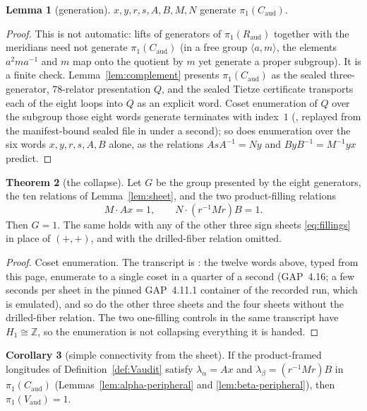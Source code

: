 \documentclass[11pt]{article}
\newcommand{\Z}{\mathbb{Z}}
\newcommand{\pione}{\pi_1}
\theoremstyle{definition}
\newtheorem{theorem}{Theorem}[section]
\newtheorem{lemma}[theorem]{Lemma}
\newtheorem{corollary}[theorem]{Corollary}
\begin{document}
\begin{lemma}[generation]\label{lem:generation}
$x,y,r,s,A,B,M,N$ generate $\pione(C_{\mathrm{aud}})$.
\end{lemma}

\begin{proof}
This is not automatic: lifts of generators of $\pione(R_{\mathrm{aud}})$
together with the meridians need not generate $\pione(C_{\mathrm{aud}})$ (in
a free group $\langle a,m\rangle$, the elements $a^2ma^{-1}$ and $m$ map
onto the quotient by $m$ yet generate a proper subgroup).  It is a finite
check.  Lemma~\ref{lem:complement} presents $\pione(C_{\mathrm{aud}})$ as
the sealed three-generator, $78$-relator presentation $Q$, and the sealed
Tietze certificate transports each of the eight loops into $Q$ as an
explicit word.  Coset enumeration of $Q$ over the subgroup those eight words
generate terminates with index~$1$
(, replayed from the
manifest-bound sealed file in under a second); so does enumeration over the
six words $x,y,r,s,A,B$ alone, as the relations $AsA^{-1}=Ny$ and
$ByB^{-1}=M^{-1}yx$ predict.
\end{proof}

\begin{theorem}[the collapse]\label{thm:collapse}
Let $G$ be the group presented by the eight generators, the ten relations of
Lemma~\ref{lem:sheet}, and the two product-filling relations
\[
 M\cdot Ax=1,\qquad N\cdot(r^{-1}Mr)B=1.
\]
Then $G=1$.  The same holds with any of the other three sign sheets
\eqref{eq:fillings} in place of $(+,+)$, and with the drilled-fiber
relation omitted.
\end{theorem}

\begin{proof}
Coset enumeration.  The transcript is
: the twelve words
above, typed from this page, enumerate to a single coset in a quarter of a
second (GAP~4.16; a few seconds per sheet in the pinned GAP~4.11.1 container
of the recorded run, which is emulated), and so do the other three sheets
and the four sheets without the drilled-fiber relation.  The two one-filling
controls in the same transcript have $H_1\cong\Z$, so the enumeration is
not collapsing everything it is handed.
\end{proof}

\begin{corollary}[simple connectivity from the sheet]\label{cor:pi1-from-sheet}
If the product-framed longitudes of Definition~\ref{def:Vaudit} satisfy
$\lambda_\alpha=Ax$ and $\lambda_\beta=(r^{-1}Mr)B$ in
$\pione(C_{\mathrm{aud}})$ (Lemmas~\ref{lem:alpha-peripheral} and
\ref{lem:beta-peripheral}), then $\pione(V_{\mathrm{aud}})=1$.
\end{corollary}
\end{document}
